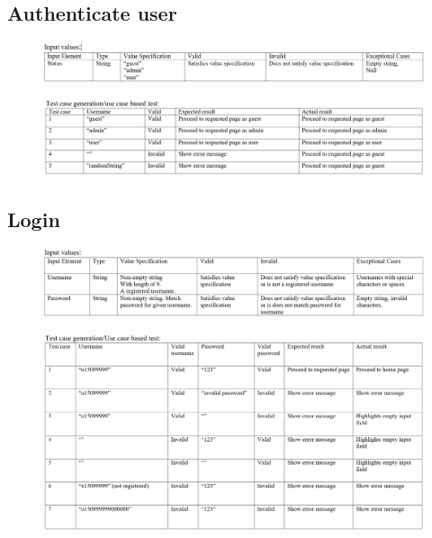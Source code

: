 \documentclass[english]{article}
\begin{document}
\subsection{Authenticate user}
\begin{figure}[ht!]
\hspace*{-2.5cm}
\includegraphics[width=180mm]{1.png}
\end{figure}
\begin{figure}[ht!]
\hspace*{-2.5cm}
\includegraphics[width=180mm]{2.png}
\end{figure}
\subsection{Login}
\begin{figure}[H]
\hspace*{-2.5cm}
\includegraphics[width=180mm]{3.png}
\end{figure}
\begin{figure}[H]
\hspace*{-2.5cm}
\includegraphics[width=180mm]{4.png}
\end{figure}
\end{document}
